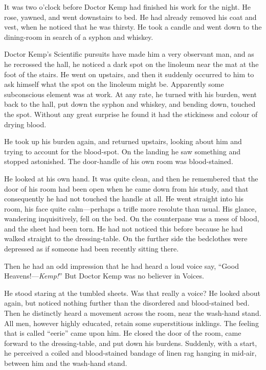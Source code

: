 It was two o’clock before Doctor Kemp had finished his work for the night. He rose, yawned, and went downstairs to bed. He had already removed his coat and vest, when he noticed that he was thirsty. He took a candle and went down to the dining-room in search of a syphon and whiskey.

Doctor Kemp’s Scientific pursuits have made him a very observant man, and as he recrossed the hall, he noticed a dark spot on the linoleum near the mat at the foot of the stairs. He went on upstairs, and then it suddenly occurred to him to ask himself what the spot on the linoleum might be. Apparently some subconscious element was at work. At any rate, he turned with his burden, went back to the hall, put down the syphon and whiskey, and bending down, touched the spot. Without any great surprise he found it had the stickiness and colour of drying blood.

He took up his burden again, and returned upstairs, looking about him and trying to account for the blood-spot. On the landing he saw something and stopped astonished. The door-handle of his own room was blood-stained.

He looked at his own hand. It was quite clean, and then he remembered that the door of his room had been open when he came down from his study, and that consequently he had not touched the handle at all. He went straight into his room, his face quite calm—perhaps a trifle more resolute than usual. His glance, wandering inquisitively, fell on the bed. On the counterpane was a mess of blood, and the sheet had been torn. He had not noticed this before because he had walked straight to the dressing-table. On the further side the bedclothes were depressed as if someone had been recently sitting there.

Then he had an odd impression that he had heard a loud voice say, “Good Heavens!—\emph{Kemp!}” But Doctor Kemp was no believer in Voices.

He stood staring at the tumbled sheets. Was that really a voice? He looked about again, but noticed nothing further than the disordered and blood-stained bed. Then he distinctly heard a movement across the room, near the wash-hand stand. All men, however highly educated, retain some superstitious inklings. The feeling that is called “eerie” came upon him. He closed the door of the room, came forward to the dressing-table, and put down his burdens. Suddenly, with a start, he perceived a coiled and blood-stained bandage of linen rag hanging in mid-air, between him and the wash-hand stand.

